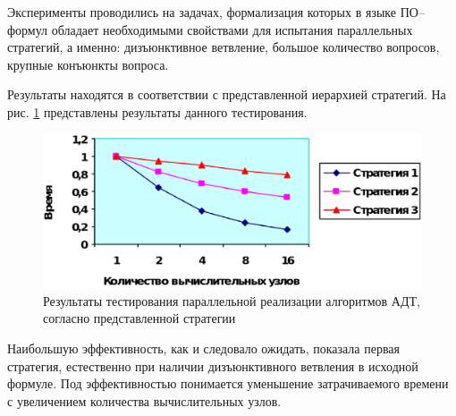 Эксперименты проводились на задачах, формализация которых в языке ПО--формул обладает необходимыми свойствами для испытания параллельных стратегий, а именно: дизъюнктивное ветвление, большое количество вопросов, крупные конъюнкты вопроса.

Результаты находятся в соответствии с представленной иерархией стратегий. На рис. \ref{fig:parallel} представлены результаты данного тестирования.

\begin{figure}[h]
	\centering
	\includegraphics[width=0.6\linewidth]{pics/Parallel.eps}
	\caption{Результаты тестирования параллельной реализации алгоритмов АДТ, согласно представленной стратегии}
	\label{fig:parallel}
\end{figure}

Наибольшую эффективность, как и следовало ожидать, показала первая стратегия, естественно при наличии дизъюнктивного ветвления в исходной формуле. Под эффективностью понимается уменьшение затрачиваемого времени с увеличением количества вычислительных узлов.


